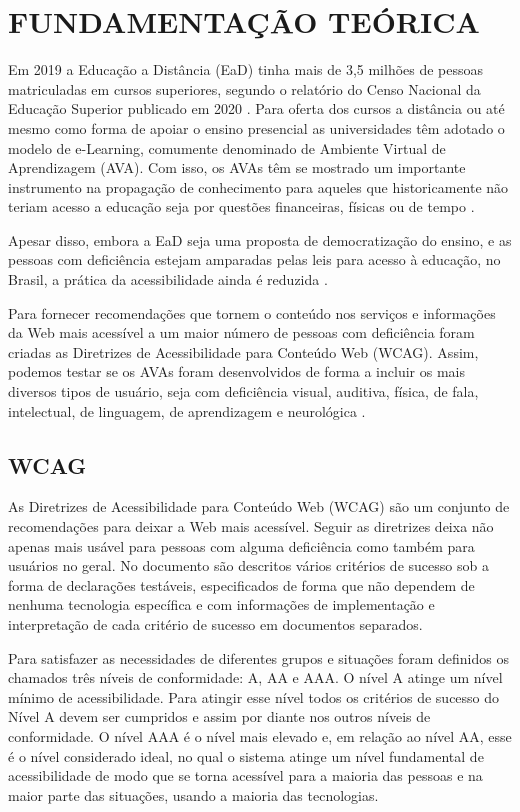 \documentclass[
	12pt,				%
	openright,			%
	oneside,			%
	a4paper,			%
	chapter=TITLE,		%
	section=TITLE,		%
	subsection=TITLE,	%
	subsubsection=TITLE,%
	english,			%
	brazil				%
	]{abntex2}
\theoremstyle{definition}
\begin{document}
\chapter{FUNDAMENTAÇÃO TEÓRICA}

Em 2019 a Educação a Distância (EaD) tinha mais de 3,5 milhões de pessoas matriculadas em cursos superiores, segundo o relatório do Censo Nacional da Educação Superior publicado em 2020 \cite{da2019notas}. Para oferta dos cursos a distância ou até mesmo como forma de apoiar o ensino presencial as universidades têm adotado o modelo de e-Learning, comumente denominado de Ambiente Virtual de Aprendizagem (AVA). Com isso, os AVAs têm se mostrado um importante instrumento na propagação de conhecimento para aqueles que historicamente não teriam acesso a educação seja por questões financeiras, físicas ou de tempo \cite{sharma2014quantitative}.

Apesar disso, embora a EaD seja uma proposta de democratização do ensino, e as pessoas com deficiência estejam amparadas pelas leis para acesso à educação, no Brasil, a prática da acessibilidade ainda é reduzida \cite{dos2021acessibilidade}.

Para fornecer recomendações que tornem o conteúdo nos serviços e informações da Web mais acessível a um maior número de pessoas com deficiência foram criadas as Diretrizes de Acessibilidade para Conteúdo Web (WCAG). Assim, podemos testar se os AVAs foram desenvolvidos de forma a incluir os mais diversos tipos de usuário, seja com deficiência visual, auditiva, física, de fala, intelectual, de linguagem, de aprendizagem e neurológica \cite{caldwell2008web}.

\section{WCAG}
 
As Diretrizes de Acessibilidade para Conteúdo Web (WCAG) são um conjunto de recomendações para deixar a Web mais acessível. Seguir as diretrizes deixa não apenas mais usável para pessoas com alguma deficiência como também para usuários no geral. No documento são descritos vários critérios de sucesso sob a forma de declarações testáveis, especificados de forma que não dependem de nenhuma tecnologia específica e com informações de implementação e interpretação de cada critério de sucesso em documentos separados.

Para satisfazer as necessidades de diferentes grupos e situações foram definidos os chamados três níveis de conformidade: A, AA e AAA. O nível A atinge um nível mínimo de acessibilidade. Para atingir esse nível todos os critérios de sucesso do Nível A devem ser cumpridos e assim por diante nos outros níveis de conformidade. O nível AAA é o nível mais elevado e, em relação ao nível AA, esse é o nível considerado ideal, no qual o sistema atinge um nível fundamental de acessibilidade de modo que se torna acessível para a maioria das pessoas e na maior parte das situações, usando a maioria das tecnologias.
\end{document}
